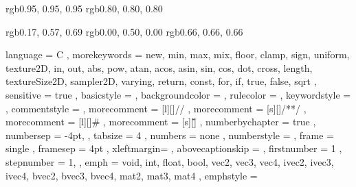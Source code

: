 

\definecolor{codeBkgnd}  {rgb}{0.95, 0.95, 0.95} 
\definecolor{codeFrame}  {rgb}{0.80, 0.80, 0.80} 

\definecolor{lightblue}  {rgb}{0.17, 0.57, 0.69}
\definecolor{darkgreen}  {rgb}{0.00, 0.50, 0.00}
\definecolor{lightgrey}  {rgb}{0.66, 0.66, 0.66}

\lstset
{
	language         = C
,	morekeywords     = {new, min, max, mix, floor, clamp, sign, uniform, texture2D, in, out, abs, pow, atan, acos, asin, sin, cos, dot, cross, length, textureSize2D, sampler2D, varying, return, const, for, if, true, false, sqrt }
,	sensitive        = true
,	basicstyle       = \footnotesize\ttfamily
,	backgroundcolor  = \color{codeBkgnd}
,	rulecolor        = \color{codeFrame}
,	keywordstyle     = \color{codeKeyword}
,	commentstyle     = \color{codeComment}
,	morecomment      = [l][\color{darkgreen}]{//}
,	morecomment      = [s][\color{darkgreen}]{/*}{*/}
,	morecomment      = [l][\color{lightblue}]{\#}
,	morecomment      = [s][\color{lightgrey}]{\"}{\"}
,	numberbychapter  = true
,	numbersep        = -4pt,
,	tabsize          =  4          
,	numbers          = none
,	numberstyle      = \tiny
,	frame            = single
,	framesep         =  4pt
, xleftmargin=\parindent
,	abovecaptionskip = \medskipamount
, firstnumber      = 1
, stepnumber       = 1,
,	emph             = { void, int, float, bool, vec2, vec3, vec4, ivec2, ivec3, ivec4, bvec2, bvec3, bvec4, mat2, mat3, mat4 }
,	emphstyle        = \color{lightblue} 
}
